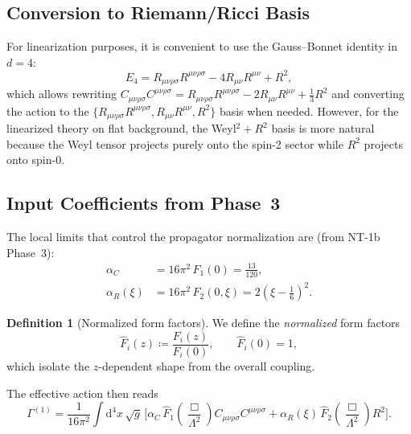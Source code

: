 \documentclass[11pt,a4paper]{article}
\newcommand{\Ricsq}{R_{\mu\nu}R^{\mu\nu}}
\newcommand{\Weylsq}{C_{\mu\nu\rho\sigma}C^{\mu\nu\rho\sigma}}
\renewcommand{\dd}{\mathrm{d}}
\theoremstyle{plain}
\theoremstyle{definition}
\newtheorem{definition}[theorem]{Definition}
\begin{document}
\subsection{Conversion to Riemann/Ricci Basis}

For linearization purposes, it is convenient to use the Gauss--Bonnet
identity in $d = 4$:
\begin{equation}\label{eq:GB}
  E_4 = R_{\mu\nu\rho\sigma}R^{\mu\nu\rho\sigma}
  - 4\Ricsq + R^2,
\end{equation}
which allows rewriting $\Weylsq = R_{\mu\nu\rho\sigma}R^{\mu\nu\rho\sigma}
- 2\Ricsq + \frac{1}{3}R^2$ and converting the action to the
$\{R_{\mu\nu\rho\sigma}R^{\mu\nu\rho\sigma}, \Ricsq, R^2\}$ basis
when needed. However, for the linearized theory on flat background,
the Weyl$^2 + R^2$ basis is more natural because the Weyl tensor
projects purely onto the spin-2 sector while $R^2$ projects onto
spin-0.

\subsection{Input Coefficients from Phase~3}

The local limits that control the propagator normalization are
(from NT-1b Phase~3):
\begin{align}
  \alpha_C &= 16\pi^2\, F_1(0) = \frac{13}{120},
  \label{eq:alpha_C}\\
  \alpha_R(\xi) &= 16\pi^2\, F_2(0,\xi)
  = 2\left(\xi - \frac{1}{6}\right)^2.
  \label{eq:alpha_R}
\end{align}

\begin{definition}[Normalized form factors]\label{def:Fhat}
We define the \emph{normalized} form factors
\begin{equation}
  \hat{F}_i(z) \coloneqq \frac{F_i(z)}{F_i(0)},
  \qquad \hat{F}_i(0) = 1,
\end{equation}
which isolate the $z$-dependent shape from the overall coupling.
\end{definition}

The effective action then reads
\begin{equation}\label{eq:Gamma-norm}
  \Gamma^{(1)} = \frac{1}{16\pi^2} \int \dd^4 x\,\sqrt{g}\,
  \Big[\alpha_C\, \hat{F}_1\!\left(\frac{\Box}{\Lambda^2}\right) \Weylsq
  + \alpha_R(\xi)\, \hat{F}_2\!\left(\frac{\Box}{\Lambda^2}\right)
  R^2\Big].
\end{equation}

\end{document}
